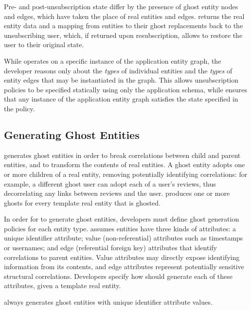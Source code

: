 Pre- and post-unsubscription state differ by the presence of ghost entity nodes and edges, which
have taken the place of real entities and edges. \sys returns the real entity data and a mapping
from entities to their ghost replacements back to the unsubscribing user, which, if returned upon
resubscription, allows \sys to restore the user to their original state.

While \sys operates on a specific instance of the application entity graph, the developer reasons
only about the \emph{types} of individual entities and the \emph{types} of entity edges that may be
instantiated in the graph. This allows unsubscription policies to be specified statically using only
the application schema, while \sys ensures that any instance of the application entity graph
satisfies the state specified in the policy.

\subsection{Generating Ghost Entities}
\label{sec:ghosting}

\sys generates ghost entities in order to break correlations between child and parent entities, and
to transform the contents of real entities. 
A ghost entity adopts one or more children of a real entity, removing potentially identifying
correlations: for example, a different ghost user can adopt each of a user's reviews, thus
decorrelating any links between reviews and the user. \sys produces one or more ghosts for every
template real entity that is ghosted. 

In order for \sys to generate ghost entities, developers must define ghost generation policies for
each entity type.  \sys assumes entities have three kinds of attributes: a unique identifier
attribute; value (non-referential) attributes such as timestamps or usernames; and edge (referential
foreign key) attributes that identify correlations to parent entities.  Value attributes may
directly expose identifying information from its contents, and edge attributes represent potentially
sensitive structural correlations.  Developers specify how \sys should generate each of these
attributes, given a template real entity.

\sys always generates ghost entities with unique identifier attribute values.

